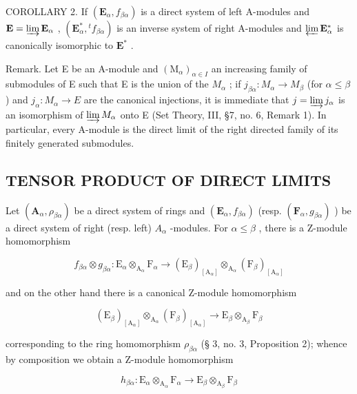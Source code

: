 COROLLARY 2. If \((\mathbf{E}_{\alpha}, f_{\beta \alpha})\) is a direct system of left A-modules and \(\mathbf{E} = \varinjlim \mathbf{E}_{\alpha}\) , \((\mathbf{E}_{\alpha}^{*}, {}^t f_{\beta \alpha})\) is an inverse system of right A-modules and \(\varprojlim \mathbf{E}_{\alpha}^{*}\) is canonically isomorphic to \(\mathbf{E}^{*}\) .

Remark. Let E be an A-module and \((\mathrm{M}_{\alpha})_{\alpha\in I}\) an increasing family of submodules of E such that E is the union of the \(M_{\alpha}\) ; if \(j_{\beta\alpha}:M_{\alpha}\to M_{\beta}\) (for \(\alpha\leqslant\beta\) ) and \(j_{\alpha}:M_{\alpha}\to E\) are the canonical injections, it is immediate that \(j=\varinjlim j_{\alpha}\) is an isomorphism of \(\varinjlim M_{\alpha}\) onto E (Set Theory, III, §7, no. 6, Remark 1). In particular, every A-module is the direct limit of the right directed family of its finitely generated submodules.

\subsection{TENSOR PRODUCT OF DIRECT LIMITS}

Let \((\mathbf{A}_{\alpha}, \rho_{\beta\alpha})\) be a direct system of rings and \((\mathbf{E}_{\alpha}, f_{\beta\alpha})\) (resp. \((\mathbf{F}_{\alpha}, g_{\beta\alpha})\) ) be a direct system of right (resp. left) \(A_{\alpha}\) -modules. For \(\alpha \leqslant \beta\) , there is a Z-module homomorphism

\[
f _ {\beta \alpha} \otimes g _ {\beta \alpha}: \mathrm{E} _ {\alpha} \otimes_ {\mathrm{A} _ {\alpha}} \mathrm{F} _ {\alpha} \rightarrow (\mathrm{E} _ {\beta}) _ {[ \mathrm{A} _ {\alpha} ]} \otimes_ {\mathrm{A} _ {\alpha}} (\mathrm{F} _ {\beta}) _ {[ \mathrm{A} _ {\alpha} ]}
\]

and on the other hand there is a canonical Z-module homomorphism

\[
\left(\mathrm{E} _ {\beta}\right) _ {[ \mathrm{A} _ {\alpha} ]} \otimes_ {\mathrm{A} _ {\alpha}} \left(\mathrm{F} _ {\beta}\right) _ {[ \mathrm{A} _ {\alpha} ]} \rightarrow \mathrm{E} _ {\beta} \otimes_ {\mathrm{A} _ {\beta}} \mathrm{F} _ {\beta}
\]

corresponding to the ring homomorphism \(\rho_{\beta \alpha}\) (§ 3, no. 3, Proposition 2); whence by composition we obtain a Z-module homomorphism

\[
h _ {\beta \alpha}: \mathrm{E} _ {\alpha} \otimes_ {\mathrm{A} _ {\alpha}} \mathrm{F} _ {\alpha} \rightarrow \mathrm{E} _ {\beta} \otimes_ {\mathrm{A} _ {\beta}} \mathrm{F} _ {\beta}
\]

